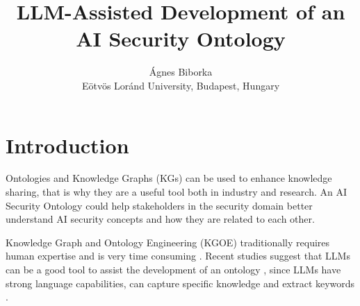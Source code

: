 \documentclass{article}
\title{LLM-Assisted Development of an AI Security Ontology}
\author{Ágnes Biborka\\
Eötvös Loránd University, Budapest, Hungary}
\begin{document}
\maketitle


\section{Introduction}

Ontologies and Knowledge Graphs (KGs) can be used to enhance knowledge sharing, that is why they are a useful tool both in industry and research. An AI Security Ontology could help stakeholders in the security domain better understand AI security concepts and how they are related to each other.

Knowledge Graph and Ontology Engineering (KGOE) traditionally requires human expertise and is very time consuming \cite{Poveda-Villaln2022}. Recent studies suggest that LLMs can be a good tool to assist the development of an ontology \cite{Shimizu2025, Kommineni2024}, since LLMs have strong language capabilities, can capture specific knowledge and extract keywords \cite{Shimizu2025, Kommineni2024}.




\end{document}
